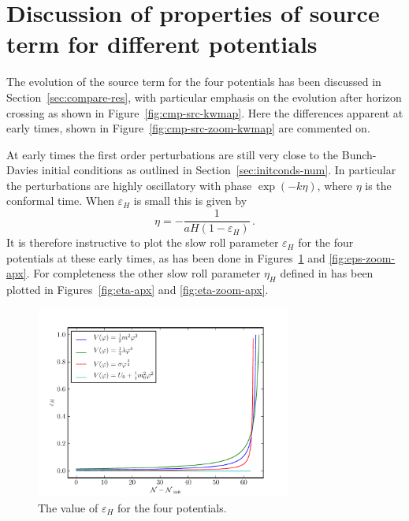 \section{Discussion of properties of source term for different potentials}
\label{sec:apx-srcdisc}
The evolution of the source term for the four potentials has been discussed in
Section~\ref{sec:compare-res}, with particular emphasis on the evolution after horizon crossing as
shown in Figure~\ref{fig:cmp-src-kwmap}. Here the differences apparent at early times, shown in
Figure~\ref{fig:cmp-src-zoom-kwmap} are commented on.

At early times the first order perturbations are still very close to the Bunch-Davies initial
conditions as outlined in Section~\ref{sec:initconds-num}. In particular the perturbations are
highly oscillatory with phase $\exp(-k\eta)$, where $\eta$ is the conformal time. When
$\varepsilon_H$ is small this is given by 
% 
\begin{equation}
 \eta = -\frac{1}{aH(1-\varepsilon_H)}\,.
\end{equation}
% 
It is therefore instructive to plot the slow roll parameter $\varepsilon_H$ for the four potentials
at these early times, as has been done in Figures~\ref{fig:eps-apx} and \ref{fig:eps-zoom-apx}. For
completeness the other slow roll parameter $\eta_H$ defined in  has been
plotted in Figures~\ref{fig:eta-apx} and \ref{fig:eta-zoom-apx}. 

\begin{figure}
 \centering
 \includegraphics[width=0.75\textwidth]{numerical/graphs/epsilon_slowroll-large.pdf}
 \caption[Value of $\varepsilon_H$ for the Four Potentials]{The value of $\varepsilon_H$ for
the four potentials.}
 \label{fig:eps-apx}
\end{figure}

